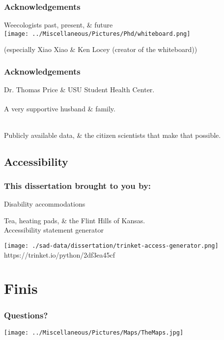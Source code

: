 \documentclass[14pt]{beamer}
\begin{document}
\begin{frame}{}
\frametitle{Acknowledgements}
Weecologists past, present, \& future\\
\texttt{[image: ../Miscellaneous/Pictures/Phd/whiteboard.png]}
\begin{tiny}
(especially Xiao Xiao \& Ken Locey (creator of the whiteboard))
\end{tiny}
\end{frame}

\begin{frame}[t]{}
\frametitle{Acknowledgements}
Dr. Thomas Price \& USU Student Health Center.\\
~\\
A very supportive husband \& family.\\
~\\
\begin{Large}
Publicly available data, \& the citizen scientists that make that possible.\\
\end{Large}
\end{frame}

\subsection{Accessibility}
\begin{frame}[t]{}
\frametitle{This dissertation brought to you by:}
\begin{large}
Disability accommodations\\
\end{large}
Tea, heating pads, \& the Flint Hills of Kansas.\\
Accessibility statement generator
\begin{center}
\texttt{[image: ./sad-data/dissertation/trinket-access-generator.png]}\\
https://trinket.io/python/2df3ea45cf
\end{center}
\end{frame}

\section{Finis}
\begin{frame}[t]
\frametitle{Questions?}
\begin{center}
\texttt{[image: ../Miscellaneous/Pictures/Maps/TheMaps.jpg]}
\end{center}
\end{frame}
\end{document}
